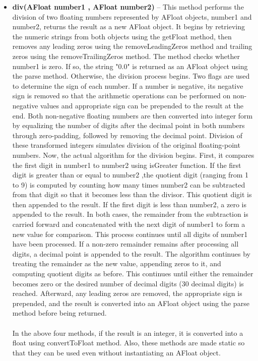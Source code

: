 \documentclass[a4paper,12pt]{article}
\begin{document}
{\begin{itemize}
    \item \textbf{div(AFloat number1 , AFloat number2)} -- This method performs the division of two floating numbers represented by AFloat objects, number1 and number2, returns the result as a new AFloat object. It begins by retrieving the numeric strings from both objects using the getFloat method, then removes any leading zeros using the removeLeadingZeros method and trailing zeros using the removeTrailingZeros method. The method checks whether number1 is zero. If so, the string "0.0" is returned as an AFloat object using the parse method. Otherwise, the division process begins. Two flags are used to determine the sign of each number. If a number is negative, its negative sign is removed so that the arithmetic operations can be performed on non-negative values and appropriate sign can be prepended to the result at the end. Both non-negative floating numbers are then converted into integer form by equalizing the number of digits after the decimal point in both numbers through zero-padding, followed by removing the decimal point. Division of these transformed integers simulates division of the original floating-point numbers. Now, the actual algorithm for the division begins. First, it compares the first digit in number1 to number2 using isGreater function. If the first digit is greater than or equal to number2 ,the quotient digit (ranging from 1 to 9) is computed by counting how many times number2 can be subtracted from that digit so that it becomes less than the divisor. This quotient digit is then appended to the result. If the first digit is less than number2, a zero is appended to the result. In both cases, the remainder from the subtraction is carried forward and concatenated with the next digit of number1 to form a new value for comparison. This process continues until all digits of number1 have been processed. If a non-zero remainder remains after processing all digits, a decimal point is appended to the result. The algorithm continues by treating the remainder as the new value, appending zeros to it, and computing quotient digits as before. This continues until either the remainder becomes zero or the desired number of decimal digits (30 decimal digits) is reached. Afterward, any leading zeros are removed, the appropriate sign is prepended, and the result is converted into an AFloat object using the parse method before being returned.\\\\
    In the above four methods, if the result is an integer, it is converted into a float using convertToFloat method. Also, these methods are made static so that they can be used even without instantiating an AFloat object.\\
\end{itemize}

}
\end{document}
